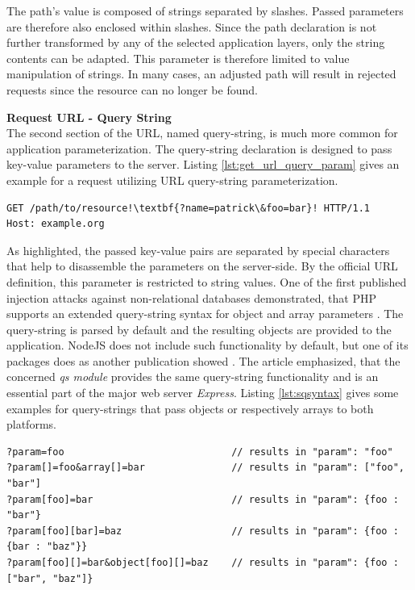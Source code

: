 The path's value is composed of strings separated by slashes. Passed parameters are therefore also enclosed within slashes. Since the path declaration is not further transformed by any of the selected application layers, only the string contents can be adapted. This parameter is therefore limited to value manipulation of strings. In many cases, an adjusted path will result in rejected requests since the resource can no longer be found.

\textbf{Request URL - Query String}\\
The second section of the URL, named query-string, is much more common for application parameterization. The query-string declaration is designed to pass key-value parameters to the server. Listing \ref{lst:get_url_query_param} gives an example for a request utilizing URL query-string parameterization. \\

\begin{lstlisting}[escapechar=!, caption={Example for GET request with URL query parameterization}, label={lst:get_url_query_param}]
GET /path/to/resource!\textbf{?name=patrick\&foo=bar}! HTTP/1.1
Host: example.org
\end{lstlisting}

As highlighted, the passed key-value pairs are separated by special characters that help to disassemble the parameters on the server-side. By the official URL definition, this parameter is restricted to string values. One of the first published injection attacks against non-relational databases demonstrated, that PHP supports an extended query-string syntax for object and array parameters \cite{Sullivan:2011}. The query-string is parsed by default and the resulting objects are provided to the application. NodeJS does not include such functionality by default, but one of its packages does as another publication showed \cite{Petkov:2014a}. The article emphasized, that the concerned \textit{qs module} provides the same query-string functionality and is an essential part of the major web server \textit{Express}. Listing \ref{lst:sqsyntax} gives some examples for query-strings that pass objects or respectively arrays to both platforms. \\

\begin{lstlisting}[caption={Examples for extended query-string syntax}, label={lst:sqsyntax}]
?param=foo                             // results in "param": "foo"
?param[]=foo&array[]=bar               // results in "param": ["foo", "bar"]
?param[foo]=bar                        // results in "param": {foo : "bar"}
?param[foo][bar]=baz                   // results in "param": {foo : {bar : "baz"}}
?param[foo][]=bar&object[foo][]=baz    // results in "param": {foo : ["bar", "baz"]}
\end{lstlisting}

